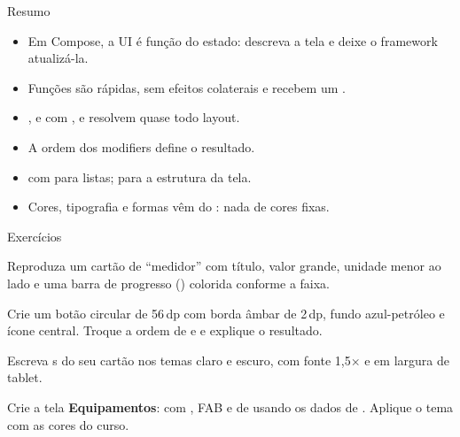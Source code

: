 \documentclass[aspectratio=169,10pt]{beamer}
\begin{document}
\begin{frame}{Resumo}
  \begin{resumo}
    \begin{itemize}
      \item Em Compose, a UI é função do estado: descreva a tela e deixe o framework atualizá-la.
      \item Funções  são rápidas, sem efeitos colaterais e recebem um .
      \item {},  e  com ,  e  resolvem quase todo layout.
      \item A ordem dos modifiers define o resultado.
      \item {} com  para listas;  para a estrutura da tela.
      \item Cores, tipografia e formas vêm do : nada de cores fixas.
    \end{itemize}
  \end{resumo}
\end{frame}

\begin{frame}{Exercícios}
  \begin{exercicio}
    Reproduza um cartão de ``medidor'' com título, valor grande, unidade menor ao lado e uma barra de progresso () colorida conforme a faixa.
  \end{exercicio}
  \begin{exercicio}
    Crie um botão circular de 56\,dp com borda âmbar de 2\,dp, fundo azul-petróleo e ícone central. Troque a ordem de  e  e explique o resultado.
  \end{exercicio}
  \begin{exercicio}
    Escreva s do seu cartão nos temas claro e escuro, com fonte 1,5$\times$ e em largura de tablet.
  \end{exercicio}
  \begin{projeto}
    Crie a tela \textbf{Equipamentos}:  com , FAB e  de  usando os dados de . Aplique o tema com as cores do curso.
  \end{projeto}
\end{frame}
\end{document}
